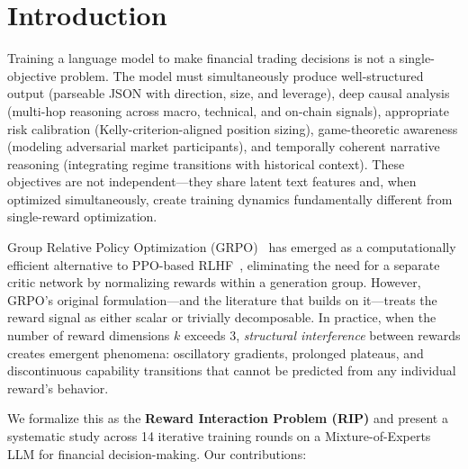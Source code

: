 \documentclass[sigconf]{acmart}
\begin{document}


\maketitle

\section{Introduction}
\label{sec:intro}

Training a language model to make financial trading decisions is not a single-objective problem. The model must simultaneously produce well-structured output (parseable JSON with direction, size, and leverage), deep causal analysis (multi-hop reasoning across macro, technical, and on-chain signals), appropriate risk calibration (Kelly-criterion-aligned position sizing), game-theoretic awareness (modeling adversarial market participants), and temporally coherent narrative reasoning (integrating regime transitions with historical context). These objectives are not independent---they share latent text features and, when optimized simultaneously, create training dynamics fundamentally different from single-reward optimization.

Group Relative Policy Optimization (GRPO)~\cite{shao2024deepseekmath} has emerged as a computationally efficient alternative to PPO-based RLHF~\cite{ouyang2022training}, eliminating the need for a separate critic network by normalizing rewards within a generation group. However, GRPO's original formulation---and the literature that builds on it---treats the reward signal as either scalar or trivially decomposable. In practice, when the number of reward dimensions $k$ exceeds 3, \textit{structural interference} between rewards creates emergent phenomena: oscillatory gradients, prolonged plateaus, and discontinuous capability transitions that cannot be predicted from any individual reward's behavior.

We formalize this as the \textbf{Reward Interaction Problem (RIP)} and present a systematic study across 14 iterative training rounds on a Mixture-of-Experts LLM for financial decision-making. Our contributions:
\end{document}
